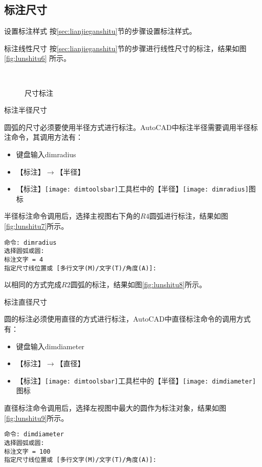 \subsection{标注尺寸}
\begin{procedure}
\item 设置标注样式
按\ref{sec:lianjieganshitu}节的步骤设置标注样式。
\item 标注线性尺寸
按\ref{sec:lianjieganshitu}节的步骤进行线性尺寸的标注，结果如图\ref{fig:lunshitu6} 所示。

\begin{figure}[htbp]
\centering
{}\hspace{20pt}
\\
\hspace{20pt}
\caption{尺寸标注}
\end{figure}
\item 标注半径尺寸

圆弧的尺寸必须要使用半径方式进行标注。AutoCAD中标注半径需要调用半径标注命令，其调用方法有：
\begin{itemize}
\item 键盘输入dimradius
\item 【标注】$\rightarrow $【半径】
\item 【标注】\texttt{[image: dimtoolsbar]}工具栏中的【半径】\texttt{[image: dimradius]}图标
\end{itemize}

半径标注命令调用后，选择主视图右下角的$R4$圆弧进行标注，结果如图\ref{fig:lunshitu7}所示。
\begin{lstlisting}
命令: dimradius
选择圆弧或圆:
标注文字 = 4
指定尺寸线位置或 [多行文字(M)/文字(T)/角度(A)]:
\end{lstlisting}

以相同的方式完成$R2$圆弧的标注，结果如图\ref{fig:lunshitu8}所示。
\item 标注直径尺寸

圆的标注必须使用直径的方式进行标注，AutoCAD中直径标注命令的调用方式有：
\begin{itemize}
\item 键盘输入dimdiameter
\item 【标注】$\rightarrow $【直径】
\item 【标注】\texttt{[image: dimtoolsbar]}工具栏中的【半径】\texttt{[image: dimdiameter]}图标
\end{itemize}

直径标注命令调用后，选择左视图中最大的圆作为标注对象，结果如图\ref{fig:lunshitu9}所示。

\begin{lstlisting}
命令: dimdiameter
选择圆弧或圆:
标注文字 = 100
指定尺寸线位置或 [多行文字(M)/文字(T)/角度(A)]:
\end{lstlisting}
\end{procedure}
\endinput